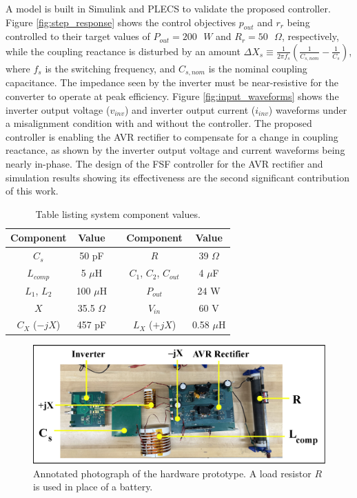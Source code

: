 \documentclass[conference, twocolumn, letterpaper]{IEEEtran}
\begin{document}
A model is built in Simulink and PLECS to validate the proposed controller. Figure \ref{fig:step_response} shows the control objectives $p_{out}$ and $r_r$ being controlled to their target values of $P_{out} = 200 \texttt{ }W$ and $R_r = 50 \texttt{ }\Omega$, respectively, while the coupling reactance is disturbed by an amount $\Delta X_s \equiv \frac{1}{2 \pi f_s}(\frac{1}{C_{s,nom}} - \frac{1}{C_s})$, where $f_s$ is the switching frequency, and $C_{s,nom}$ is the nominal coupling capacitance. The impedance seen by the inverter must be near-resistive for the converter to operate at peak efficiency. Figure \ref{fig:input_waveforms} shows the inverter output voltage ($v_{inv}$) and inverter output current ($i_{inv}$) waveforms under a misalignment condition with and without the controller. The proposed controller is enabling the AVR rectifier to compensate for a change in coupling reactance, as shown by the inverter output voltage and current waveforms being nearly in-phase. The design of the FSF controller for the AVR rectifier and simulation results showing its effectiveness are the second significant contribution of this work.

\begin{table}[h]
\centering
\caption{Table listing system component values.}
\label{tab:sys_params}
\begin{tabular}{c|c|c|c|c}
\midrule
\textbf{Component} & \textbf{Value} & & \textbf{Component} & \textbf{Value} \\
\midrule
$C_s$ & 50 pF & & $R$ & 39 $\Omega$ \\
$L_{comp}$ & 5 $\mu$H & & $C_1$, $C_2$, $C_{out}$ & 4 $\mu$F \\
$L_1$, $L_2$ & 100 $\mu$H & & $P_{out}$ & 24 W  \\
$X$ & 35.5 $\Omega$ & & $V_{in}$ & 60 V \\
$C_X$ ($-jX$) & 457 pF & & $L_X$ ($+jX$) & 0.58 $\mu$H\\
\midrule
\end{tabular}
\end{table}

\vspace{-0.5cm}

\begin{figure}[!ht]
	\centering
	\includegraphics[width=\linewidth]{figures/prototype_annotated_eps.eps}
	\caption{Annotated photograph of the hardware prototype. A load resistor $R$ is used in place of a battery.}
	\label{fig:hardware_prototype}
\end{figure}
\end{document}
